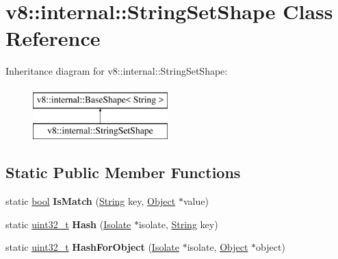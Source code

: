 \hypertarget{classv8_1_1internal_1_1StringSetShape}{}\section{v8\+:\+:internal\+:\+:String\+Set\+Shape Class Reference}
\label{classv8_1_1internal_1_1StringSetShape}
Inheritance diagram for v8\+:\+:internal\+:\+:String\+Set\+Shape\+:\begin{figure}[H]
\begin{center}
\leavevmode
\includegraphics[height=2.000000cm]{classv8_1_1internal_1_1StringSetShape}
\end{center}
\end{figure}
\subsection*{Static Public Member Functions}
\begin{DoxyCompactItemize}
\item 
\mbox{\label{classv8_1_1internal_1_1StringSetShape_af3d0f6aabe763799c1a5c858c179ea0d}} 
static \mbox{\hyperlink{classbool}{bool}} {\bfseries Is\+Match} (\mbox{\hyperlink{classv8_1_1internal_1_1String}{String}} key, \mbox{\hyperlink{classv8_1_1internal_1_1Object}{Object}} $\ast$value)
\item 
\mbox{\label{classv8_1_1internal_1_1StringSetShape_a72ba76ea4288099bf6228d7652dbc8e8}} 
static \mbox{\hyperlink{classuint32__t}{uint32\+\_\+t}} {\bfseries Hash} (\mbox{\hyperlink{classv8_1_1internal_1_1Isolate}{Isolate}} $\ast$isolate, \mbox{\hyperlink{classv8_1_1internal_1_1String}{String}} key)
\item 
\mbox{\label{classv8_1_1internal_1_1StringSetShape_a1f36dd823757b5c55de997e270fcf1e8}} 
static \mbox{\hyperlink{classuint32__t}{uint32\+\_\+t}} {\bfseries Hash\+For\+Object} (\mbox{\hyperlink{classv8_1_1internal_1_1Isolate}{Isolate}} $\ast$isolate, \mbox{\hyperlink{classv8_1_1internal_1_1Object}{Object}} $\ast$object)
\end{DoxyCompactItemize}
